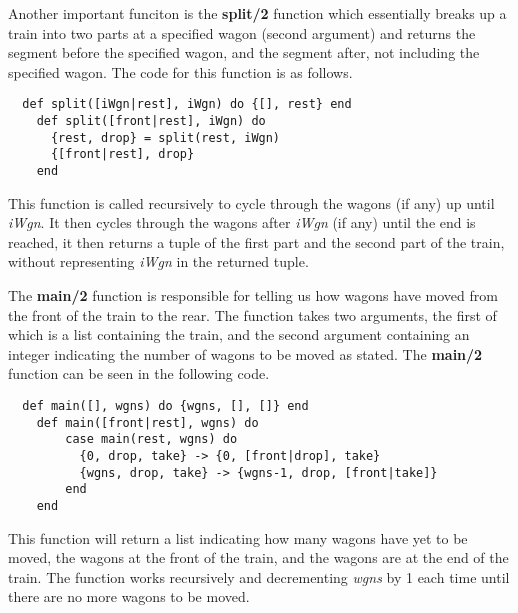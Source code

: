 \documentclass[a4paper,11pt]{article}
\begin{document}
 Another important funciton is the \textbf{split/2} function which essentially breaks up a train into two parts at a specified wagon (second argument) and returns the segment before the specified wagon, and the segment after, not including the specified wagon. The code for this function is as follows.
 \begin{verbatim}
  def split([iWgn|rest], iWgn) do {[], rest} end
    def split([front|rest], iWgn) do
      {rest, drop} = split(rest, iWgn)
      {[front|rest], drop}
    end
\end{verbatim}
This function is called recursively to cycle through the wagons (if any) up until \textit{iWgn}. It then cycles through the wagons after \textit{iWgn} (if any) until the end is reached, it then returns a tuple of the first part and the second part of the train, without representing \textit{iWgn} in the returned tuple.

The \textbf{main/2} function is responsible for telling us how wagons have moved from the front of the train to the rear. The function takes two arguments, the first of which is a list containing the train, and the second argument containing an integer indicating the number of wagons to be moved as stated. The \textbf{main/2} function can be seen in the following code.
\begin{verbatim}
  def main([], wgns) do {wgns, [], []} end
    def main([front|rest], wgns) do
        case main(rest, wgns) do
          {0, drop, take} -> {0, [front|drop], take}
          {wgns, drop, take} -> {wgns-1, drop, [front|take]}
        end
    end
\end{verbatim}
This function will return a list indicating how many wagons have yet to be moved, the wagons at the front of the train, and the wagons are at the end of the train. The function works recursively and decrementing \textit{wgns} by 1 each time until there are no more wagons to be moved.
\end{document}
